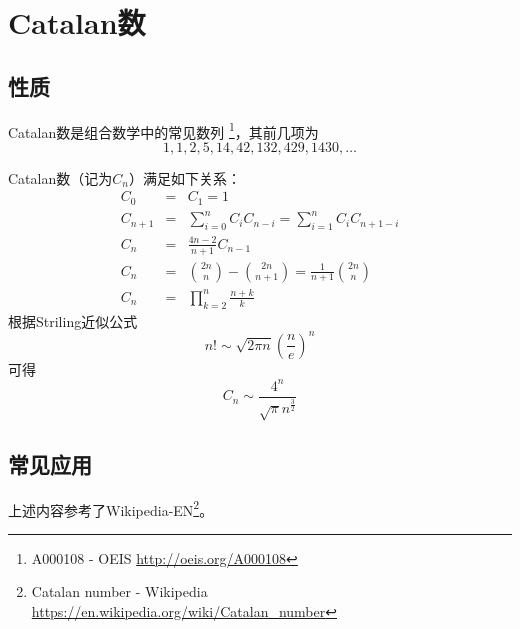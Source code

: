 \section{Catalan数}
\subsection{性质}
Catalan数是组合数学中的常见数列
\footnote{A000108 - OEIS \url{http://oeis.org/A000108}}，其前几项为
\begin{displaymath}
    1, 1, 2, 5, 14, 42, 132, 429, 1430, \ldots
\end{displaymath}

Catalan数（记为$C_n$）满足如下关系：
\begin{eqnarray*}
C_0&=&C_1=1\\
C_{n+1}&=&\sum_{i=0}^n{C_iC_{n-i}}=\sum_{i=1}^n{C_iC_{n+1-i}}\\
C_n&=&\frac{4n-2}{n+1}C_{n-1}\\
C_n&=&{2n \choose n}-{2n \choose n+1}=\frac{1}{n+1}{2n \choose n}\\
C_n&=&\prod_{k=2}^n\frac{n+k}{k}
\end{eqnarray*}
根据Striling近似公式
\begin{displaymath}
    n!\sim\sqrt{2\pi n}\left(\frac{n}{e}\right)^n
\end{displaymath}
可得
\begin{displaymath}
C_n\sim\frac{4^n}{\sqrt{\pi} n^\frac{3}{2}}
\end{displaymath}
\subsection{常见应用}

上述内容参考了Wikipedia-EN\footnote{Catalan number - Wikipedia
\url{https://en.wikipedia.org/wiki/Catalan\_number}}。
